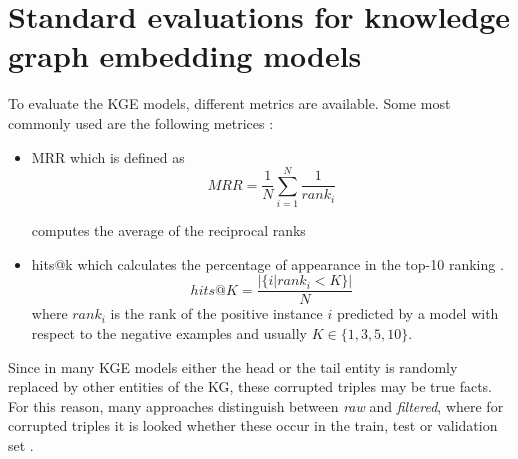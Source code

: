 \section{Standard evaluations for knowledge graph embedding models} 
To evaluate the \ac{KGE} models, different metrics are available.
Some most commonly used are the following metrices \cite{kotnis2017analysis}:
\begin{itemize}
    \item 
    \ac{MRR} which is defined as
    \begin{equation}
        MRR = \frac{1}{N} \sum_{i=1}^{N}\frac{1}{rank_i}
    \end{equation}
    
    computes the average of the reciprocal ranks \cite{zhang2021efficient}
    
    \item 
    hits@k which calculates the percentage of appearance in the top-10 ranking \cite{zhang2021efficient}.
    \begin{equation}
        hits@K = \frac{|\{i | rank_i < K\}|}{N}
    \end{equation}
    where $rank_i$ is the rank of the positive instance $i$ predicted by a model with respect to the negative examples and usually $K \in \{1, 3, 5, 10\}$.
\end{itemize}
Since in many \ac{KGE} models either the head or the tail entity is randomly replaced by other entities of the KG, these corrupted triples may be true facts.
For this reason, many approaches distinguish between \textit{raw} and \textit{filtered}, where for corrupted triples it is looked whether these occur in the train, test or validation set \cite{TransE}.

